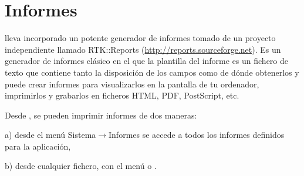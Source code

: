 \chapter{Informes }
\appname lleva incorporado un potente generador de informes tomado de un
proyecto independiente llamado RTK::Reports
(\href{http://reports.sourceforge.net/}{http://reports.sourceforge.net}).
Es un generador de informes clásico en el que la plantilla del
informe es un fichero de texto que contiene tanto la disposición de
los campos como de dónde obtenerlos y puede crear informes para
visualizarlos en la pantalla de tu ordenador, imprimirlos y grabarlos
en ficheros HTML, PDF, PostScript, etc.

Desde \appname, se pueden imprimir informes de dos maneras:

a) desde el menú Sistema$\rightarrow $Informes se accede a todos los
informes definidos para la aplicación,

b) desde cualquier fichero, con el menú
 o
.


\bigskip


\bigskip


\bigskip


\bigskip


\bigskip


\bigskip

\clearpage